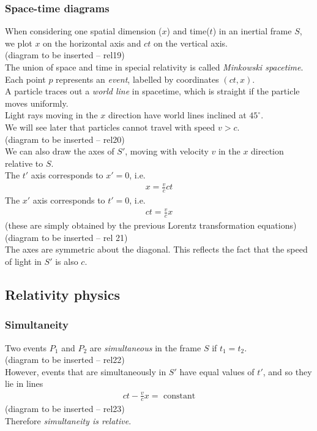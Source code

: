 \documentclass[a4paper]{article}
\begin{document}
\subsubsection{Space-time diagrams}
When considering one spatial dimension ($x$) and time($t$) in an inertial frame $S$, we plot $x$ on the horizontal axis and $ct$ on the vertical axis.\\
(diagram to be inserted -- rel19)\\
The union of space and time in special relativity is called \emph{Minkowski spacetime}.\\
Each point $p$ represents an \emph{event}, labelled by coordinates $\left(ct,x\right)$.\\
A particle traces out a \emph{world line} in spacetime, which is straight if the particle moves uniformly.\\
Light rays moving in the $x$ direction have world lines inclined at $45^\circ$.\\
We will see later that particles cannot travel with speed $v>c$.\\
(diagram to be inserted -- rel20)\\
We can also draw the axes of $S'$, moving with velocity $v$ in the $x$ direction relative to $S$.\\
The $t'$ axis corresponds to $x'=0$, i.e.
\begin{equation*}
\begin{aligned}
x=\frac{v}{c}ct
\end{aligned}
\end{equation*}
The $x'$ axis corresponds to $t'=0$, i.e.
\begin{equation*}
\begin{aligned}
ct = \frac{v}{c}x
\end{aligned}
\end{equation*}
(these are simply obtained by the previous Lorentz transformation equations)\\
(diagram to be inserted -- rel 21)\\
The axes are symmetric about the diagonal. This reflects the fact that the speed of light in $S'$ is also $c$.

\subsection{Relativity physics}
\subsubsection{Simultaneity}
Two events $P_1$ and $P_2$ are \emph{simultaneous} in the frame $S$ if $t_1 = t_2$.\\
(diagram to be inserted -- rel22)\\
However, events that are simultaneously in $S'$ have equal values of $t'$, and so they lie in lines
\begin{equation*}
\begin{aligned}
ct-\frac{v}{c}x=\text{   constant}
\end{aligned}
\end{equation*}
(diagram to be inserted -- rel23)\\
Therefore \emph{simultaneity is relative}.
\end{document}
